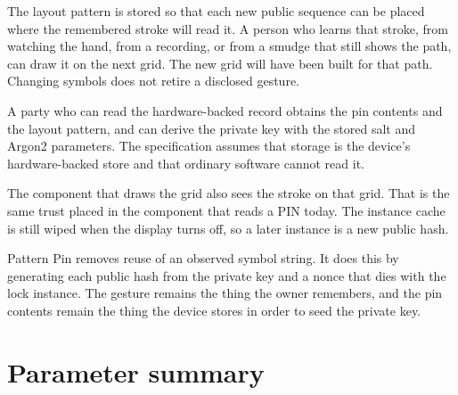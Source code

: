 \documentclass[11pt]{article}
\begin{document}
\begin{description}[style=nextline]
  \item[The gesture is durable.]
    The layout pattern is stored so that each new public sequence can be placed where the remembered stroke will read it.
    A person who learns that stroke, from watching the hand, from a recording, or from a smudge that still shows the path, can draw it on the next grid.
    The new grid will have been built for that path.
    Changing symbols does not retire a disclosed gesture.
  \item[The sealed record is the long-term secret.]
    A party who can read the hardware-backed record obtains the pin contents and the layout pattern, and can derive the private key with the stored salt and Argon2 parameters.
    The specification assumes that storage is the device's hardware-backed store and that ordinary software cannot read it.
  \item[A live instance is inside the trusted unlock path.]
    The component that draws the grid also sees the stroke on that grid.
    That is the same trust placed in the component that reads a PIN today.
    The instance cache is still wiped when the display turns off, so a later instance is a new public hash.
\end{description}

Pattern Pin removes reuse of an observed symbol string.
It does this by generating each public hash from the private key and a nonce that dies with the lock instance.
The gesture remains the thing the owner remembers, and the pin contents remain the thing the device stores in order to seed the private key.

\section{Parameter summary}
\end{document}
